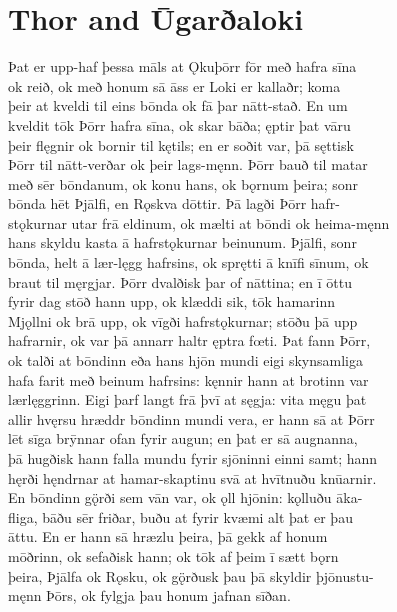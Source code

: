 \documentclass[12pt,letterpaper]{book}
\newcommand\emptypage{\clearpage{\pagestyle{empty}\cleardoublepage}}
\begin{document}
\emptypage

\chapter{Thor and Ūgarðaloki}

\resetlinenumber
\begin{linenumbers}

Þat er upp-haf þessa māls at Ǫkuþōrr fōr með hafra sīna\\
ok reið, ok með honum sā āss er Loki er kallaðr; koma\\
þeir at kveldi til eins bōnda ok fā þar nātt-stað.  En um\\
kveldit tōk Þōrr hafra sīna, ok skar bāða; ęptir þat vāru\\
þeir flęgnir ok bornir til kętils; en er soðit var, þā sęttisk\\
Þōrr til nātt-verðar ok þeir lags-męnn.  Þōrr bauð til matar\\
með sēr bōndanum, ok konu hans, ok bǫrnum þeira; sonr\\
bōnda hēt Þjālfi, en Rǫskva dōttir.  Þā lagði Þōrr hafr-\\
stǫkurnar utar frā eldinum, ok mælti at bōndi ok heima-męnn\\
hans skyldu kasta ā hafrstǫkurnar beinunum.  Þjālfi, sonr\\
bōnda, helt ā lær-lęgg hafrsins, ok sprętti ā knīfi sīnum, ok\\
braut til męrgjar.  Þōrr dvalðisk þar of nāttina; en ī ōttu\\
fyrir dag stōð hann upp, ok klæddi sik, tōk hamarinn\\
Mjǫllni ok brā upp, ok vīgði hafrstǫkurnar; stōðu þā upp\\
hafrarnir, ok var þā annarr haltr ęptra fœti.  Þat fann Þōrr,\\
ok talði at bōndinn eða hans hjōn mundi eigi skynsamliga\\
hafa farit með beinum hafrsins: kęnnir hann at brotinn var\\
lærlęggrinn.  Eigi þarf langt frā þvī at sęgja: vita męgu þat\\
allir hvęrsu hræddr bōndinn mundi vera, er hann sā at Þōrr\\
lēt sīga brȳnnar ofan fyrir augun; en þat er sā augnanna,\\
þā hugðisk hann falla mundu fyrir sjōninni einni samt; hann\\
hęrði hęndrnar at hamar-skaptinu svā at hvītnuðu knūarnir.\\
En bōndinn gǫ̈rði sem vān var, ok ǫll hjōnin: kǫlluðu āka-\\
fliga, bāðu sēr friðar, buðu at fyrir kvæmi alt þat er þau\\
āttu.  En er hann sā hræzlu þeira, þā gekk af honum\\
mōðrinn, ok sefaðisk hann; ok tōk af þeim ī sætt bǫrn\\
þeira, Þjālfa ok Rǫsku, ok gǫ̈rðusk þau þā skyldir þjōnustu-\\
męnn Þōrs, ok fylgja þau honum jafnan sīðan.


\end{linenumbers}
\end{document}
